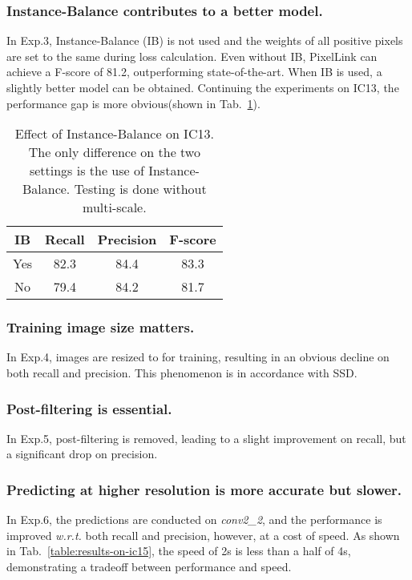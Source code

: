 \documentclass[letterpaper]{article} \usepackage{aaai18}  \usepackage{times}  \usepackage{helvet}  \usepackage{courier}  \usepackage{url}  \usepackage{graphicx}
\begin{document}
	\subsubsection{Instance-Balance contributes to a better model.}
	In Exp.3, Instance-Balance (IB) is not used and the weights of all positive pixels are set to the same during loss calculation. Even without IB, PixelLink can achieve a F-score of 81.2, outperforming state-of-the-art. When IB is used, a slightly better model can be obtained. Continuing the experiments on IC13, the performance gap is more obvious(shown in Tab.~\ref{table:ib-on-ic13}).  
	\begin{table}
		\caption{Effect of Instance-Balance on IC13. The only difference on the two settings is the use of Instance-Balance. Testing is done without multi-scale.}
		\label{table:ib-on-ic13}
		\centering
		\begin{tabular}{|c|c|c|c|}
			\hline
			IB  &Recall     &Precision      &F-score \\ \hline \hline
			Yes &82.3       &84.4           &83.3 \\ \hline
			No  &79.4       &84.2           &81.7 \\ \hline
		\end{tabular}
	\end{table}
	\subsubsection{Training image size matters.}
	In Exp.4, images are resized to  for training, resulting in an obvious decline on both recall and precision. This phenomenon is in accordance with SSD.
	\subsubsection{Post-filtering is essential.}
	In Exp.5, post-filtering is removed, leading to a slight improvement on recall, but a significant drop on precision.
	\subsubsection{Predicting at higher resolution is more accurate but slower.}
	In Exp.6, the predictions are conducted on \emph{conv2\_2}, and the performance is improved \emph{\mbox{w.r.t.}} both recall and precision, however, at a cost of speed. As shown in Tab.~\ref{table:results-on-ic15}, the speed of 2s is less than a half of 4s, demonstrating a tradeoff between performance and speed.
	
\end{document}
